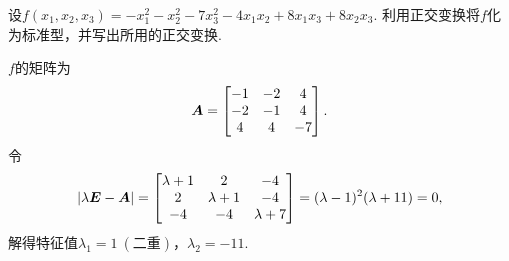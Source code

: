\begin{example}
设\(f(x_1,x_2,x_3) = -x_1^2-x_2^2-7x_3^2-4x_1x_2+8x_1x_3+8x_2x_3\).
利用正交变换将\(f\)化为标准型，并写出所用的正交变换.
\begin{solution}
\(f\)的矩阵为\begin{equation*}
	\boldsymbol{A} = \begin{bmatrix}
		-1 & -2 & 4 \\
		-2 & -1 & 4 \\
		4 & 4 & -7
	\end{bmatrix}.
\end{equation*}
令\begin{equation*}
	\abs{\lambda\boldsymbol{E}-\boldsymbol{A}}
	= \begin{bmatrix}
		\lambda+1 & 2 & -4 \\
		2 & \lambda+1 & -4 \\
		-4 & -4 & \lambda+7
	\end{bmatrix}
	= (\lambda-1)^2 (\lambda+11)
	= 0,
\end{equation*}
解得特征值\(\lambda_1=1\ (\text{二重})\)，\(\lambda_2=-11\).


\end{solution}
\end{example}
